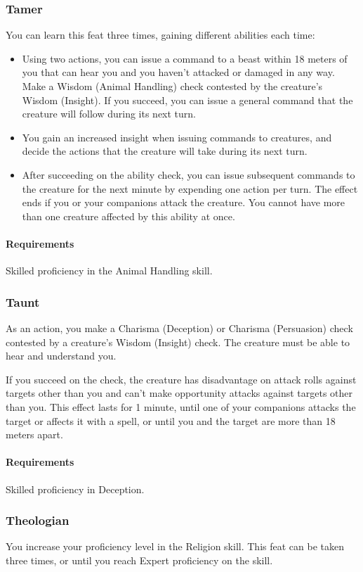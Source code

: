 \subsubsection{Tamer} \label{feat::tamer}
    You can learn this feat three times, gaining different abilities each time:
    \begin{itemize}
        \item Using two actions, you can issue a command to a beast within 18 meters of you that can hear you and you haven't attacked or damaged in any way.
        Make a Wisdom (Animal Handling) check contested by the creature's Wisdom (Insight).
        If you succeed, you can issue a general command that the creature will follow during its next turn.
        \item You gain an increased insight when issuing commands to creatures, and decide the actions that the creature will take during its next turn.
        \item After succeeding on the ability check, you can issue subsequent commands to the creature for the next minute by expending one action per turn.
        The effect ends if you or your companions attack the creature.
        You cannot have more than one creature affected by this ability at once.
    \end{itemize}
    \paragraph{Requirements} Skilled proficiency in the Animal Handling skill.
\subsubsection{Taunt} \label{feat::taunt}
    As an action, you make a Charisma (Deception) or Charisma (Persuasion) check contested by a creature's Wisdom (Insight) check.
    The creature must be able to hear and understand you.

    If you succeed on the check, the creature has disadvantage on attack rolls against targets other than you and can't make opportunity attacks against targets other than you.
    This effect lasts for 1 minute, until one of your companions attacks the target or affects it with a spell, or until you and the target are more than 18 meters apart.
    \paragraph{Requirements} Skilled proficiency in Deception.
\subsubsection{Theologian} \label{feat::theologian}
    You increase your proficiency level in the Religion skill.
    This feat can be taken three times, or until you reach Expert proficiency on the skill.
